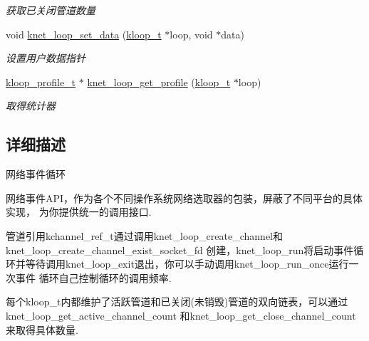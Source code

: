 \begin{DoxyCompactItemize}
\begin{DoxyCompactList}\small\item\em 获取已关闭管道数量 \end{DoxyCompactList}\item 
void \hyperlink{a00133_gaf1239ea65307d7dc588175c45947437b_gaf1239ea65307d7dc588175c45947437b}{knet\+\_\+loop\+\_\+set\+\_\+data} (\hyperlink{a00066_a97fc76209a58362019f1ded9169e397f_a97fc76209a58362019f1ded9169e397f}{kloop\+\_\+t} $\ast$loop, void $\ast$data)
\begin{DoxyCompactList}\small\item\em 设置用户数据指针 \end{DoxyCompactList}\item 
\hyperlink{a00066_ab75a5c23099a6118c469ed160b277f28_ab75a5c23099a6118c469ed160b277f28}{kloop\+\_\+profile\+\_\+t} $\ast$ \hyperlink{a00133_gafc6a946f7c7fd4fb0508ac0f88969da1_gafc6a946f7c7fd4fb0508ac0f88969da1}{knet\+\_\+loop\+\_\+get\+\_\+profile} (\hyperlink{a00066_a97fc76209a58362019f1ded9169e397f_a97fc76209a58362019f1ded9169e397f}{kloop\+\_\+t} $\ast$loop)
\begin{DoxyCompactList}\small\item\em 取得统计器 \end{DoxyCompactList}\end{DoxyCompactItemize}


\subsection{详细描述}
网络事件循环 


\begin{DoxyPre}
网络事件API，作为各个不同操作系统网络选取器的包装，屏蔽了不同平台的具体实现，
为你提供统一的调用接口.\end{DoxyPre}



\begin{DoxyPre}管道引用kchannel\_ref\_t通过调用knet\_loop\_create\_channel和knet\_loop\_create\_channel\_exist\_socket\_fd
创建，knet\_loop\_run将启动事件循环并等待调用knet\_loop\_exit退出，你可以手动调用knet\_loop\_run\_once运行一次事件
循环自己控制循环的调用频率.\end{DoxyPre}



\begin{DoxyPre}每个kloop\_t内都维护了活跃管道和已关闭(未销毁)管道的双向链表，可以通过knet\_loop\_get\_active\_channel\_count
和knet\_loop\_get\_close\_channel\_count来取得具体数量.\end{DoxyPre}



